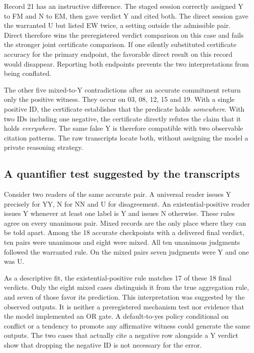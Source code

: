 \documentclass[12pt,letterpaper]{article}
\begin{document}
Record 21 has an instructive difference. The staged session correctly assigned Y to FM and N to EM, then gave verdict Y and cited both. The direct session gave the warranted U but listed EW twice, a setting outside the admissible pair. Direct therefore wins the preregistered verdict comparison on this case and fails the stronger joint certificate comparison. If one silently substituted certificate accuracy for the primary endpoint, the favorable direct result on this record would disappear. Reporting both endpoints prevents the two interpretations from being conflated.

The other five mixed-to-Y contradictions after an accurate commitment return only the positive witness. They occur on 03, 08, 12, 15 and 19. With a single positive ID, the certificate establishes that the predicate holds \emph{somewhere}. With two IDs including one negative, the certificate directly refutes the claim that it holds \emph{everywhere}. The same false Y is therefore compatible with two observable citation patterns. The raw transcripts locate both, without assigning the model a private reasoning strategy.

\subsection{A quantifier test suggested by the transcripts}
Consider two readers of the same accurate pair. A universal reader issues Y precisely for YY, N for NN and U for disagreement. An existential-positive reader issues Y whenever at least one label is Y and issues N otherwise. These rules agree on every unanimous pair. Mixed records are the only place where they can be told apart. Among the 18 accurate checkpoints with a delivered final verdict, ten pairs were unanimous and eight were mixed. All ten unanimous judgments followed the warranted rule. On the mixed pairs seven judgments were Y and one was U.

As a descriptive fit, the existential-positive rule matches 17 of these 18 final verdicts. Only the eight mixed cases distinguish it from the true aggregation rule, and seven of those favor its prediction. This interpretation was suggested by the observed outputs. It is neither a preregistered mechanism test nor evidence that the model implemented an OR gate. A default-to-yes policy conditional on conflict or a tendency to promote any affirmative witness could generate the same outputs. The two cases that actually cite a negative row alongside a Y verdict show that dropping the negative ID is not necessary for the error.
\end{document}
